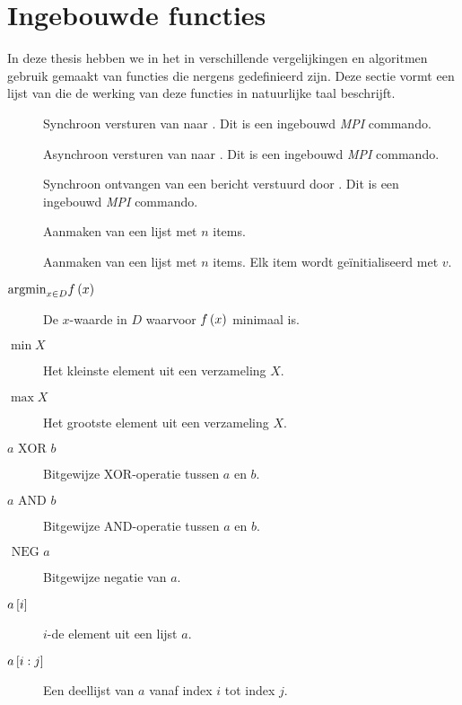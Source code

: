 \section{Ingebouwde functies}

In deze thesis hebben we in het in verschillende vergelijkingen en algoritmen gebruik gemaakt van functies die nergens gedefinieerd zijn. Deze sectie vormt een lijst van die de werking van deze functies in natuurlijke taal beschrijft.

\begin{description}
 \item [\psend{\drcv,\dmsg}] Synchroon versturen van \dmsg naar \drcv. Dit is een ingebouwd \emph{MPI} commando.
 \item [\pisnd{\drcv,\dmsg}] Asynchroon versturen van \dmsg naar \drcv. Dit is een ingebouwd \emph{MPI} commando.
 \item [\precv{\dsnd}] Synchroon ontvangen van een bericht verstuurd door \dsnd. Dit is een ingebouwd \emph{MPI} commando.
 \item [] Aanmaken van een lijst met $n$ items.
 \item [] Aanmaken van een lijst met $n$ items. Elk item wordt ge\"initialiseerd met $v$.
 \item [$\mbox{argmin}_{x\in D}f\left(x\right)$] De $x$-waarde in $D$ waarvoor $f\left(x\right)$ minimaal is.
 \item [$\min X$] Het kleinste element uit een verzameling $X$.
 \item [$\max X$] Het grootste element uit een verzameling $X$.
 \item [$a \mbox{ XOR } b$] Bitgewijze XOR-operatie tussen $a$ en $b$.
 \item [$a \mbox{ AND } b$] Bitgewijze AND-operatie tussen $a$ en $b$.
 \item [$\mbox{ NEG } a$] Bitgewijze negatie van $a$.
 \item [$a\left[i\right]$] $i$-de element uit een lijst $a$.
 \item [$a\left[i:j\right]$] Een deellijst van $a$ vanaf index $i$ tot index $j$.
 
\end{description}
